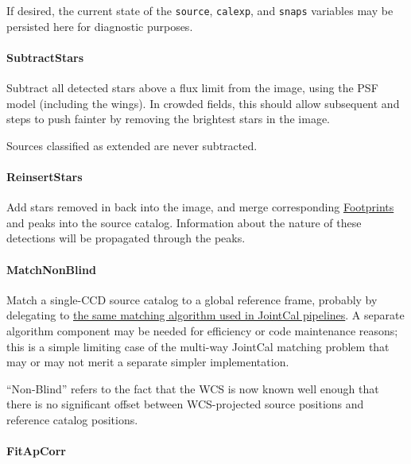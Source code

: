 If desired, the current state of the \texttt{source}, \texttt{calexp}, and \texttt{snaps} variables may be persisted here for diagnostic purposes.

\paragraph{SubtractStars}
\label{sec:drpBootstrapImChar_SubtractStars}

Subtract all detected stars above a flux limit from the image, using the PSF model (including the wings).  In crowded fields, this should allow subsequent  and  steps to push fainter by removing the brightest stars in the image.

Sources classified as extended are never subtracted.

\paragraph{ReinsertStars}
\label{sec:drpBootstrapImChar_ReinsertStars}

Add stars removed in  back into the image, and merge corresponding \hyperref[sec:spFootprints]{Footprints} and peaks into the source catalog.  Information about the nature of these detections will be propagated through the peaks.

\paragraph{MatchNonBlind}
\label{sec:drpBootstrapImChar_MatchNonBlind}

Match a single-CCD source catalog to a global reference frame, probably by delegating to \hyperref[sec:acJointCalMatching]{the same matching algorithm used in JointCal pipelines}.  A separate algorithm component may be needed for efficiency or code maintenance reasons; this is a simple limiting case of the multi-way JointCal matching problem that may or may not merit a separate simpler implementation.

``Non-Blind'' refers to the fact that the WCS is now known well enough that there is no significant offset between WCS-projected source positions and reference catalog positions.

\paragraph{FitApCorr}
\label{sec:drpBootstrapImChar_FitApCorr}

